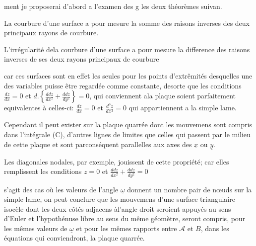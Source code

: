\documentclass[11pt,a4paper]{article}
\begin{document}

\ill{}ment je proposerai d'abord a l'examen des g
les deux théorèmes suivan.

La courbure d'une surface a pour mesure la
somme des raisons inverses des deux principaux
rayons de courbure.

L'irrégularité dela courbure d'une surface a
pour mesure la difference des raisons inverses
de ses deux rayons principaux de courbure


car ces surfaces sont en effet les seules pour les points d'extrêmités desquelles
une des variables puisse  être regardée comme constante, desorte que
les conditions $\frac{dz}{dx}=0$ et $d.\left\{\frac{ddz}{dx^2}+\frac{ddz}{dy^2}\right\}=0$, qui conviennent ala
plaque soient parfaitement equivalentes à celles-ci: $\frac{dz}{dx}=0$ et $\frac{d^3z}{dx^3}=0$
qui appartiennent a la simple lame.

Cependant il peut exister sur la plaque quarrée 
dont les mouvemens sont compris dans l'intégrale (C), d'autres lignes
de limites que celles qui passent par le milieu de cette plaque
et sont parconséquent parallelles aux axes des $\underline{x}$ ou $\underline{y}$.

Les diagonales nodales, par exemple, jouissent de cette propriété;
car elles remplissent les conditions $z=0$ et $\frac{ddz}{dx^2}+\frac{ddz}{dy^2}=0$

  s'agit des cas où les valeurs de l'angle $\underline{\omega}$ donnent
un nombre pair de nœuds sur la simple lame, on peut
conclure que les mouvemens d'une surface triangulaire isocèle
dont les deux côtés adjacens àl'angle droit seroient appuyés
au sens d'Euler et l'hypothénuse libre au sens du même
géomètre, seront compris, pour les mêmes valeurs de $\underline{\omega}$ et
pour les mêmes rapports entre $\mathcal{A}$ et $B$, dans les équations
qui conviendront,  la plaque quarrée.
\end{document}

